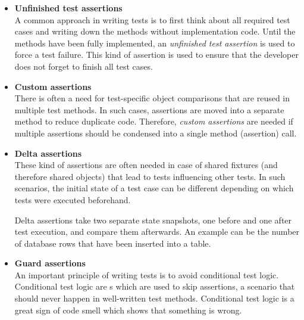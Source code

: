             \begin{itemize}
                \item \textbf{Unfinished test assertions}\\
                        A common approach in writing tests is to first think about all required test cases and writing down the methods without implementation code.
                        Until the methods have been fully implemented, an \textit{unfinished test assertion} is used to force a test failure.
                        This kind of assertion is used to ensure that the developer does not forget to finish all test cases.
                \item \textbf{Custom assertions}\\
                        There is often a need for test-specific object comparisons that are reused in multiple test methods. In such cases, assertions are moved into 
                        a separate method to reduce duplicate code. 
                        Therefore, \textit{custom assertions} are needed if multiple assertions should be condensed into a single method (assertion) call.
                \item \textbf{Delta assertions}\\
                        These kind of assertions are often needed in case of shared fixtures (and therefore shared objects) 
                        that lead to tests influencing other tests. In such scenarios, the initial state of a test case can be different depending on which tests were executed beforehand.

                        Delta assertions take two separate state snapshots, one before and one after test execution, and compare them afterwards.
                        An example can be the number of database rows that have been inserted into a table.
                \item \textbf{Guard assertions}\\
                        An important principle of writing tests is to avoid conditional test logic. 
                        Conditional test logic are s which are used to skip assertions, a scenario that should never happen in well-written test methods. 
                        Conditional test logic is a great sign of code smell which shows that something is wrong.


\end{itemize}
